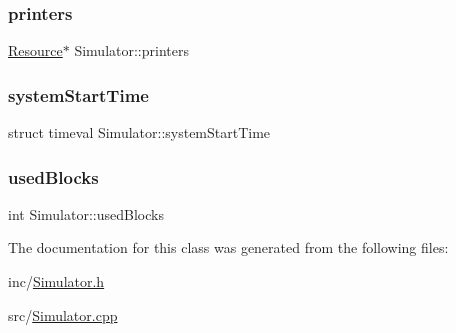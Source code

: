 \hypertarget{class_simulator_a12e757d91db13aba3ab215b38c62f786}{}\label{class_simulator_a12e757d91db13aba3ab215b38c62f786} 
\subsubsection{\texorpdfstring{printers}{printers}}
{\footnotesize\ttfamily \hyperlink{class_resource}{Resource}$\ast$ Simulator\+::printers\hspace{0.3cm}{\ttfamily [private]}}

\hypertarget{class_simulator_a7ea88bc5971154f70055f76ecef021c9}{}\label{class_simulator_a7ea88bc5971154f70055f76ecef021c9} 
\subsubsection{\texorpdfstring{system\+Start\+Time}{systemStartTime}}
{\footnotesize\ttfamily struct timeval Simulator\+::system\+Start\+Time\hspace{0.3cm}{\ttfamily [private]}}

\hypertarget{class_simulator_ad08c7310760168dd2014336ae3790ee3}{}\label{class_simulator_ad08c7310760168dd2014336ae3790ee3} 
\subsubsection{\texorpdfstring{used\+Blocks}{usedBlocks}}
{\footnotesize\ttfamily int Simulator\+::used\+Blocks\hspace{0.3cm}{\ttfamily [private]}}



The documentation for this class was generated from the following files\+:\begin{DoxyCompactItemize}
\item 
inc/\hyperlink{_simulator_8h}{Simulator.\+h}\item 
src/\hyperlink{_simulator_8cpp}{Simulator.\+cpp}\end{DoxyCompactItemize}
